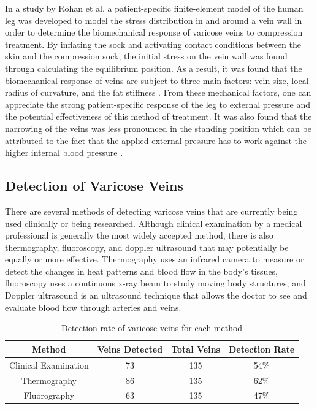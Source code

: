 \documentclass[11.5pt]{article}
\begin{document}
In a study by Rohan et al. a patient-specific finite-element model of the human leg was developed to model the stress distribution in and around a vein wall in order to determine the biomechanical response of varicose veins to compression treatment. By inflating the sock and activating contact conditions between the skin and the compression sock, the initial stress on the vein wall was found through calculating the equilibrium position. As a result, it was found that the biomechanical response of veins are subject to three main factors: vein size, local radius of curvature, and the fat stiffness \cite{Rohan}. From these mechanical factors, one can appreciate the strong patient-specific response of the leg to external pressure and the potential effectiveness of this method of treatment. It was also found that the narrowing of the veins was less pronounced in the standing position which can be attributed to the fact that the applied external pressure has to work against the higher internal blood pressure \cite{Rohan}. 

\subsection{Detection of Varicose Veins}
There are several methods of detecting varicose veins that are currently being used clinically or being researched. Although clinical examination by a medical professional is generally the most widely accepted method, there is also thermography, fluoroscopy, and doppler ultrasound that may potentially be equally or more effective. Thermography uses an infrared camera to measure or detect the changes in heat patterns and blood flow in the body's tissues, fluoroscopy uses a continuous x-ray beam to study moving body structures, and Doppler ultrasound is an ultrasound technique that allows the doctor to see and evaluate blood flow through arteries and veins.

\begin{table}[H]
	\centering
	\caption{Detection rate of varicose veins for each method \cite{Gunn}}
	\vspace{3mm}
	\begin{tabular}{cccc}
	\hline
		Method & Veins Detected & Total Veins & Detection Rate \\
	\hline
        Clinical Examination & 73 & 135 & 54\% \\
        Thermography & 86 & 135 & 62\% \\
        Fluorography & 63 & 135 & 47\%\\
	\hline 
		\end{tabular}
		\label{table:detection}
\end{table}
\end{document}
